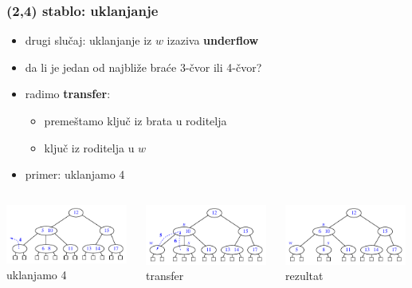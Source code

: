 \documentclass[compress,aspectratio=169]{beamer}
\begin{document}
\begin{frame}[fragile]
  \frametitle{(2,4) stablo: uklanjanje}
  \begin{itemize}
    \item drugi slučaj: uklanjanje iz $w$ izaziva \textbf{underflow}
    \item da li je jedan od najbliže braće 3-čvor ili 4-čvor?
    \item radimo \textbf{transfer}:
    \begin{itemize}
      \item premeštamo ključ iz brata u roditelja
      \item ključ iz roditelja u $w$
    \end{itemize}
    \item primer: uklanjamo 4
  \end{itemize}
  \begin{columns}
    \begin{column}[c]{4cm}
      \begin{center}
        \includegraphics[width=4cm]{asp-11-pic35a.pdf}
      \\ uklanjamo 4
      \end{center}
    \end{column}
    \begin{column}[c]{4cm}
      \begin{center}
        \includegraphics[width=4cm]{asp-11-pic35b.pdf}
      \\ transfer
      \end{center}
    \end{column}
    \begin{column}[c]{4cm}
      \begin{center}
        \includegraphics[width=4cm]{asp-11-pic35c.pdf}
      \\ rezultat
      \end{center}
    \end{column}
  \end{columns}
\end{frame}
\end{document}
